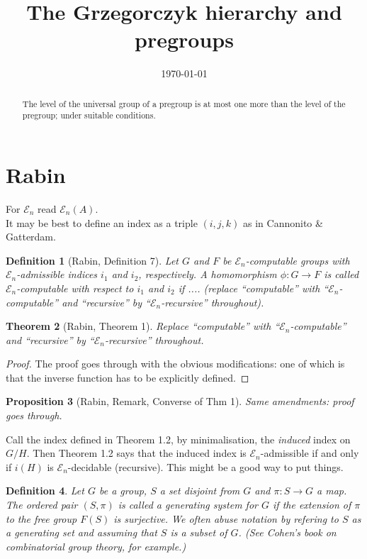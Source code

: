 \documentclass[12pt,a4paper,draft]{article}
\newcommand\cE{\mathcal{E}}
\newcommand{\maps}{\longrightarrow}
\newtheorem{theorem}{{\bf Theorem}}[section]
\newtheorem{definition}[theorem]{{\bf Definition}}
\newtheorem{proposition}[theorem]{{\bf Proposition}}
\begin{document}
\title{The Grzegorczyk hierarchy and pregroups}
\author{}

\date{\today}

\maketitle

\begin{abstract}
The level of the universal group of a pregroup is at most one
more than the level of the pregroup; under suitable conditions. 
\end{abstract}

\section{Rabin}\label{sec:rabin}
For $\cE_n$ read $\cE_n(A)$.\\[1em]

It may be best to define an index as a triple $(i,j,k)$ as in Cannonito \& Gatterdam.\\[1em] 

\begin{definition}[Rabin, Definition 7]
Let $G$ and $F$ be $\cE_n$-computable groups with $\cE_n$-admissible indices
$i_1$ and $i_2$, respectively. A homomorphism $\phi:G\maps F$ is
called $\cE_n${\em -computable} with respect to $i_1$ and $i_2$ if ....
(replace ``computable'' with ``$\cE_n$-computable'' and ``recursive'' by
``$\cE_n$-recursive'' throughout).
\end{definition}
\begin{theorem}[Rabin, Theorem 1]
Replace ``computable'' with ``$\cE_n$-computable'' and ``recursive'' by
``$\cE_n$-recursive'' throughout.
\end{theorem}
\begin{proof}
The proof goes through with the obvious modifications: one of which is
that the inverse function has to be explicitly defined. 
\end{proof}
\begin{proposition}[Rabin, Remark, Converse of Thm 1]
Same amendments: proof goes through.
\end{proposition}


Call the index defined in Theorem 1.2, by minimalisation, the {\em induced}
index on $G/H$. Then Theorem 1.2 says that the induced index is $\cE_n$-admissible if and only if $i(H)$ is $\cE_n$-decidable (recursive). This might
 be a good way to put things. 


\begin{definition}
Let $G$ be a group, $S$ a set disjoint from $G$ and $\pi:S\maps G$ a map. 
The ordered pair $(S,\pi)$ is called a {\em generating system} for
$G$ if the extension of $\pi$ to the free group $F(S)$ is surjective. 
We often abuse notation by refering to $S$ as a generating set and assuming
that $S$ is a subset of $G$. (See Cohen's book on combinatorial group theory,
for example.) 
\end{definition}
\end{document}

